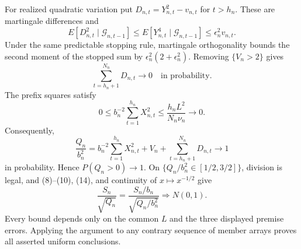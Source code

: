 For realized quadratic variation put \(D_{n,t}=Y_{n,t}^2-v_{n,t}\) for \(t>h_n\). These are martingale differences and
\[
 E[D_{n,t}^2\mid\mathcal G_{n,t-1}]
 \le E[Y_{n,t}^4\mid\mathcal G_{n,t-1}]
 \le\epsilon_n^2v_{n,t}.
\tag{11}
\]
Under the same predictable stopping rule, martingale orthogonality bounds the second moment of the stopped sum by \(\epsilon_n^2(2+\epsilon_n^2)\). Removing \(\{V_n>2\}\) gives
\[
 \sum_{t=h_n+1}^{N_n}D_{n,t}\longrightarrow0
 \quad\text{in probability}.
\tag{12}
\]
The prefix squares satisfy
\[
 0\le b_n^{-2}\sum_{t=1}^{h_n}X_{n,t}^2
 \le\frac{h_nL^2}{N_n\nu_n}\longrightarrow0.
\tag{13}
\]
Consequently,
\[
 \frac{Q_n}{b_n^2}
 =b_n^{-2}\sum_{t=1}^{h_n}X_{n,t}^2+V_n
 +\sum_{t=h_n+1}^{N_n}D_{n,t}
 \longrightarrow1
\tag{14}
\]
in probability. Hence \(P(Q_n>0)\to1\). On \(\{Q_n/b_n^2\in[1/2,3/2]\}\), division is legal, and (8)--(10), (14), and continuity of \(x\mapsto x^{-1/2}\) give
\[
 \frac{S_n}{\sqrt{Q_n}}
 =\frac{S_n/b_n}{\sqrt{Q_n/b_n^2}}\Rightarrow N(0,1).
\tag{15}
\]
Every bound depends only on the common \(L\) and the three displayed premise errors. Applying the argument to any contrary sequence of member arrays proves all asserted uniform conclusions.